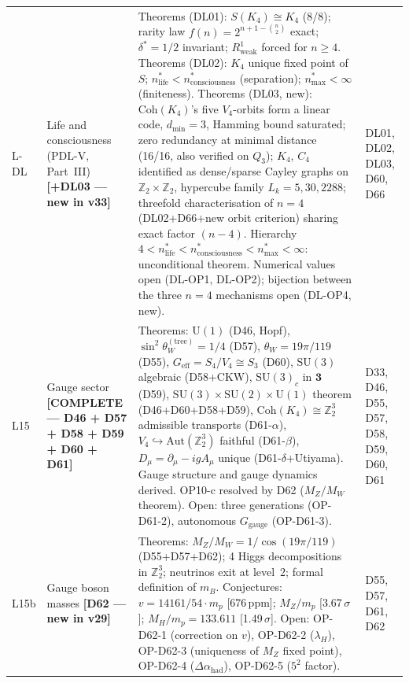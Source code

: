 \documentclass[11pt,a4paper]{article}
\theoremstyle{plain}
\theoremstyle{definition}
\theoremstyle{remark}
\newcommand{\Uone}{\mathrm{U}(1)}
\newcommand{\SUtwo}{\mathrm{SU}(2)}
\newcommand{\SUthree}{\mathrm{SU}(3)}
\newcommand{\Coh}{\mathrm{Coh}(K_4)}
\begin{document}
\begin{longtable}{L{0.6cm}L{3.0cm}L{5.5cm}L{4.0cm}}
L-DL & Life and consciousness (PDL-V, Part~III) \textbf{[+DL03 --- new in v33]} & \textcolor{proofblue}{Theorems} (DL01): $S(K_4)\cong K_4$ (8/8); rarity law $f(n)=2^{n+1-\binom{n}{2}}$ exact; $\delta^*=1/2$ invariant; $R^1_{\mathrm{weak}}$ forced for $n\geq 4$. \textcolor{proofblue}{Theorems} (DL02): $K_4$ unique fixed point of $S$; $n^*_{\mathrm{life}} < n^*_{\mathrm{consciousness}}$ (separation); $n^*_{\mathrm{max}}<\infty$ (finiteness). \textcolor{proofblue}{Theorems} (DL03, new): $\mathrm{Coh}(K_4)$'s five $V_4$-orbits form a linear code, $d_{\min}=3$, Hamming bound saturated; zero redundancy at minimal distance (16/16, also verified on $Q_3$); $K_4$, $C_4$ identified as dense/sparse Cayley graphs on $\mathbb{Z}_2\times\mathbb{Z}_2$, hypercube family $L_k=5,30,2288$; threefold characterisation of $n=4$ (DL02+D66+new orbit criterion) sharing exact factor $(n-4)$. Hierarchy $4 < n^*_{\mathrm{life}} < n^*_{\mathrm{consciousness}} < n^*_{\mathrm{max}} < \infty$: unconditional theorem. Numerical values open (DL-OP1, DL-OP2); bijection between the three $n=4$ mechanisms open (DL-OP4, new). & DL01, DL02, DL03, D60, D66\\[0.3em]
L15 & Gauge sector \textbf{[COMPLETE --- D46 + D57 + D58 + D59 + D60 + D61]} & \textcolor{proofblue}{Theorems}: $\Uone$ (D46, Hopf), $\sin^2\theta_W^{(\mathrm{tree})}=1/4$ (D57), $\theta_W=19\pi/119$ (D55), $G_{\mathrm{eff}}=S_4/V_4\cong S_3$ (D60), $\SUthree$ algebraic (D58+CKW), $\SUthree_c$ in $\mathbf{3}$ (D59), $\SUthree\times\SUtwo\times\Uone$ theorem (D46+D60+D58+D59), $\Coh\cong\mathbb{Z}_2^3$ admissible transports (D61-$\alpha$), $V_4\hookrightarrow\mathrm{Aut}(\mathbb{Z}_2^3)$ faithful (D61-$\beta$), $D_\mu=\partial_\mu-igA_\mu$ unique (D61-$\delta$+Utiyama). Gauge structure and gauge dynamics derived. OP10-c resolved by D62 ($M_Z/M_W$ theorem). Open: three generations (OP-D61-2), autonomous $G_{\mathrm{gauge}}$ (OP-D61-3). & D33, D46, D55, D57, D58, D59, D60, D61\\[0.3em]
L15b & Gauge boson masses \textbf{[D62 --- new in v29]} & \textcolor{proofblue}{Theorems}: $M_Z/M_W = 1/\cos(19\pi/119)$ (D55+D57+D62); 4 Higgs decompositions in $\mathbb{Z}_2^3$; neutrinos exit at level~2; formal definition of $m_B$. \textcolor{conjecturegreen}{Conjectures}: $v = 14161/54\cdot m_p$ [676\,ppm]; $M_Z/m_p$ [3.67\,$\sigma$]; $M_H/m_p = 133.611$ [1.49\,$\sigma$]. Open: OP-D62-1 (correction on $v$), OP-D62-2 ($\lambda_H$), OP-D62-3 (uniqueness of $M_Z$ fixed point), OP-D62-4 ($\Delta\alpha_{\mathrm{had}}$), OP-D62-5 ($5^2$ factor). & D55, D57, D61, D62\\[0.3em]

\end{longtable}
\end{document}
